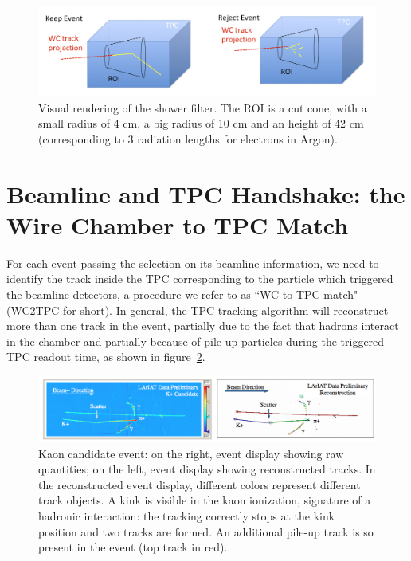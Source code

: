 \begin{figure}
  \centering  
\includegraphics[width=\textwidth]{Chapter-4/Images/Shower.png}
\caption{Visual rendering of the shower filter. The ROI is a cut cone, with a small radius of 4 cm, a big radius of 10 cm and an height of 42 cm (corresponding to 3 radiation lengths for electrons in Argon).}
\label{fig:showerFilt}
\end{figure}



\section{Beamline and TPC Handshake: the Wire Chamber to TPC Match}\label{ch:WC2TPCMatchMethod}
For each event passing the selection on its beamline information, we need to identify the track inside the TPC corresponding to the particle which triggered the beamline detectors, a procedure we refer to as ``WC to TPC match" (WC2TPC for short). In general, the TPC tracking algorithm will reconstruct more than one track in the event, partially due to the fact that hadrons interact in the chamber and partially because of pile up particles during the triggered TPC readout time, as shown in figure~\ref{fig:kaonInteraction}. 


\begin{figure}
  \centering  
\includegraphics[width=\textwidth]{Chapter-4/Images/KaonExample.png}
\caption{Kaon candidate event: on the right, event display showing raw quantities; on the left, event display showing reconstructed tracks. In the reconstructed event display, different colors represent different track objects. A kink is visible in the kaon ionization, signature of a hadronic interaction: the tracking correctly stops at the kink position and two tracks are formed. An additional pile-up track is so present in the event (top track in red).}
\label{fig:kaonInteraction}
\end{figure}



